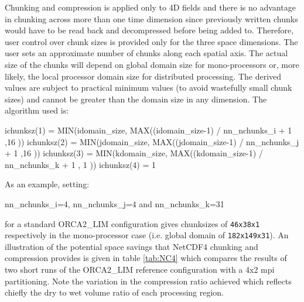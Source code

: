 \documentclass[../tex_main/NEMO_manual]{subfiles}
\begin{document}
Chunking and compression is applied only to 4D fields and
there is no advantage in chunking across more than one time dimension since
previously written chunks would have to be read back and decompressed before being added to.
Therefore, user control over chunk sizes is provided only for the three space dimensions.
The user sets an approximate number of chunks along each spatial axis.
The actual size of the chunks will depend on global domain size for mono-processors or, more likely,
the local processor domain size for distributed processing.
The derived values are subject to practical minimum values (to avoid wastefully small chunk sizes) and
cannot be greater than the domain size in any dimension.
The algorithm used is:

\begin{forlines}
ichunksz(1) = MIN(idomain_size, MAX((idomain_size-1) / nn_nchunks_i + 1 ,16 ))
ichunksz(2) = MIN(jdomain_size, MAX((jdomain_size-1) / nn_nchunks_j + 1 ,16 ))
ichunksz(3) = MIN(kdomain_size, MAX((kdomain_size-1) / nn_nchunks_k + 1 , 1 ))
ichunksz(4) = 1
\end{forlines}

\noindent As an example, setting:

\begin{forlines}
nn_nchunks_i=4, nn_nchunks_j=4 and nn_nchunks_k=31
\end{forlines}

\noindent for a standard ORCA2\_LIM configuration gives chunksizes of {\small\tt 46x38x1} respectively in
the mono-processor case (i.e. global domain of {\small\tt 182x149x31}).
An illustration of the potential space savings that NetCDF4 chunking and compression provides is given in 
table \autoref{tab:NC4} which compares the results of two short runs of the ORCA2\_LIM reference configuration with
a 4x2 mpi partitioning.
Note the variation in the compression ratio achieved which reflects chiefly the dry to wet volume ratio of
each processing region.
\end{document}
